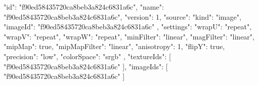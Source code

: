 {
  "id": "f90ed58435720ca8beb3a824c6831a6c",
  "name": "f90ed58435720ca8beb3a824c6831a6c",
  "version": 1,
  "source": {
    "kind": "image",
    "imageId": "f90ed58435720ca8beb3a824c6831a6c"
  },
  "settings": {
    "wrapU": "repeat",
    "wrapV": "repeat",
    "wrapW": "repeat",
    "minFilter": "linear",
    "magFilter": "linear",
    "mipMap": true,
    "mipMapFilter": "linear",
    "anisotropy": 1,
    "flipY": true,
    "precision": "low",
    "colorSpace": "srgb"
  },
  "textureIds": [
    "f90ed58435720ca8beb3a824c6831a6c"
  ],
  "imageIds": [
    "f90ed58435720ca8beb3a824c6831a6c"
  ]
}
